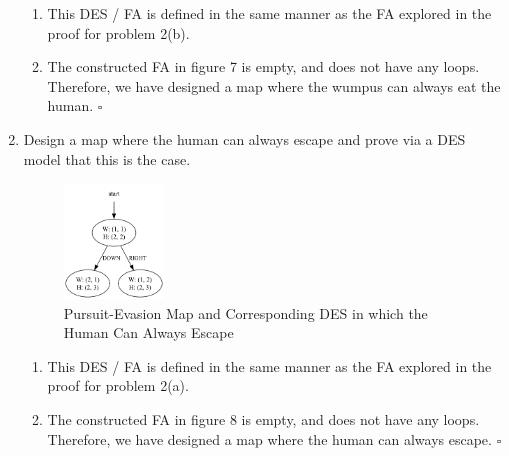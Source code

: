 \documentclass[12pt,letterpaper]{ntdhw}
\begin{document}
\begin{enumerate}
    \begin{enumerate}
        \item This DES / FA is defined in the same manner as the FA explored in the proof for problem 2(b).
        \item The constructed FA in figure 7 is empty, and does not have any loops. Therefore, we have designed a map where the wumpus can always eat the human. $\square$
    \end{enumerate}

  \item Design a map where the human can always escape and prove via a
  DES model that this is the case.
    \begin{figure}[ht]
      \centering
      \includegraphics[width=0.25\textwidth]{images/wumpus4.png}
      \caption{Pursuit-Evasion Map and Corresponding DES in which the Human Can Always Escape}
    \end{figure}

    \begin{enumerate}
        \item This DES / FA is defined in the same manner as the FA explored in the proof for problem 2(a).
        \item The constructed FA in figure 8 is empty, and does not have any loops. Therefore, we have designed a map where the human can always escape. $\square$
    \end{enumerate}

\end{enumerate}
\end{document}
